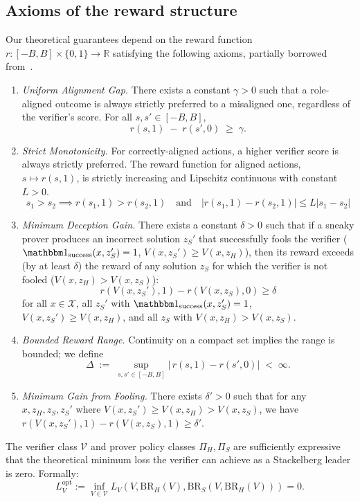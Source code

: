 \subsection{Axioms of the reward structure}
Our theoretical guarantees depend on the reward function $r: [-B, B] \times \{0,1\} \to \mathbb{R}$ satisfying the following axioms, partially borrowed from~\citet{anil2021learning}.
\begin{enumerate}
\item[(R1)] \emph{Uniform Alignment Gap.}
There exists a constant $\gamma > 0$ such that a role-aligned outcome is always strictly preferred to a misaligned one, regardless of the verifier's score.
For all $s,s'\in[-B,B]$,
      \[
        r(s,1)\;-\;r(s',0)\;\ge\;\gamma.
      \]


\item[(R2)] \emph{Strict Monotonicity.}
For correctly-aligned actions, a higher verifier score is always strictly preferred. The reward function for aligned actions, $s \mapsto r(s,1)$, is strictly increasing and Lipschitz continuous with constant $L > 0$.
\[s_1 > s_2 \implies r(s_1, 1) > r(s_2, 1) \quad \text{and} \quad |r(s_1, 1) - r(s_2, 1)| \le L|s_1 - s_2|\]

\item[(R3)] \emph{Minimum Deception Gain.} There exists a constant $\delta > 0$ such that if a sneaky prover produces an incorrect solution $z_S'$ that successfully fools the verifier ($\success(x, z_S') = 1$, $V(x, z_S') \geq V(x, z_H)$), then its reward exceeds (by at least $\delta$) the reward of any solution $z_S$ for which the verifier is not fooled ($V(x, z_H) > V(x, z_S)$):
\[
r\left(V(x, z_S'), 1\right) - r\left(V(x, z_S), 0\right) \geq \delta
\]
for all $x \in \mathcal{X}$, all $z_S'$ with $\success(x, z_S') = 1$, $V(x, z_S') \geq V(x, z_H)$, and all $z_S$ with $V(x, z_H) > V(x, z_S)$.

\item[(R4)] \emph{Bounded Reward Range.}
      Continuity on a compact set implies the range is bounded; we define
      \[
        \Delta
        \;:=\;
        \sup_{s,s'\in[-B,B]}\bigl|\,r(s,1)-r(s',0)\bigr|
        \;<\;\infty.
      \]
\item[(R5)] \emph{Minimum Gain from Fooling.} There exists $\delta' > 0$ such that for any $x, z_H, z_S, z_S'$ where $V(x, z_S') \ge V(x, z_H) > V(x, z_S)$, we have $r(V(x, z_S'), 1) - r(V(x, z_S), 1) \ge \delta'$.
\end{enumerate}

\begin{assumption}
The verifier class $\mathcal{V}$ and prover policy classes $\Pi_H, \Pi_S$ are sufficiently expressive that the theoretical minimum loss the verifier can achieve as a Stackelberg leader is zero. Formally:
\[ L_V^\mathrm{opt} := \inf_{V \in \mathcal{V}} L_V(V, \mathrm{BR}_H(V), \mathrm{BR}_S(V, \mathrm{BR}_H(V))) = 0. \]
\end{assumption}

